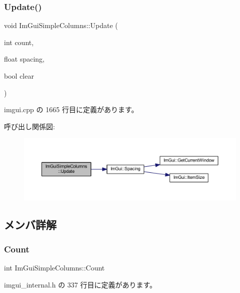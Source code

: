 \subsubsection{\texorpdfstring{Update()}{Update()}}
{\footnotesize\ttfamily void Im\+Gui\+Simple\+Columns\+::\+Update (\begin{DoxyParamCaption}\item[{int}]{count,  }\item[{float}]{spacing,  }\item[{bool}]{clear }\end{DoxyParamCaption})}



 imgui.\+cpp の 1665 行目に定義があります。

呼び出し関係図\+:\nopagebreak
\begin{figure}[H]
\begin{center}
\leavevmode
\includegraphics[width=350pt]{struct_im_gui_simple_columns_a189662e328df2bf6947d9ab292f8ed21_cgraph}
\end{center}
\end{figure}


\subsection{メンバ詳解}
\mbox{\label{struct_im_gui_simple_columns_ac5fdbd35f74c31992c95fc4b759e9c2f}} 
\subsubsection{\texorpdfstring{Count}{Count}}
{\footnotesize\ttfamily int Im\+Gui\+Simple\+Columns\+::\+Count}



 imgui\+\_\+internal.\+h の 337 行目に定義があります。

\mbox{\label{struct_im_gui_simple_columns_afa5623a5d27aadeb8c08d925b189397e}} 

